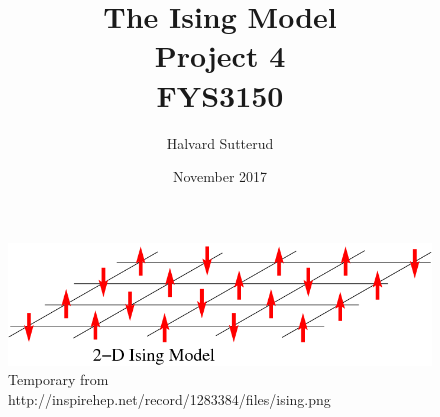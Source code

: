 \documentclass[10pt]{article}
\begin{document}
\title{The Ising Model
\\ Project 4
\\ FYS3150}
\author{Halvard Sutterud}
\date{November 2017}
\maketitle{\begin{center}\end{center}}
\thispagestyle{empty}

\begin{figure}[H]
    \centering
    \includegraphics[width=0.8\linewidth]{../results/front.png}
    \caption{Temporary from http://inspirehep.net/record/1283384/files/ising.png}
    \label{fig:front}
\end{figure}
\end{document}
